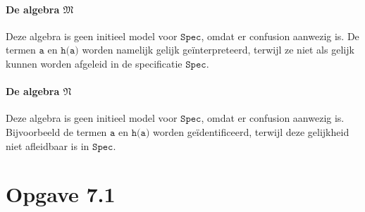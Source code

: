 \documentclass[a4paper,11pt]{article}
\begin{document}
\begin{description}
\paragraph{De algebra $\mathfrak{M}$}

Deze algebra is geen initieel model voor $\texttt{Spec}$, omdat er confusion
aanwezig is. De termen $\texttt{a}$ en $\texttt{h(a)}$ worden namelijk gelijk
ge\"interpreteerd, terwijl ze niet als gelijk kunnen worden afgeleid in de
specificatie $\texttt{Spec}$.

\paragraph{De algebra $\mathfrak{N}$}

Deze algebra is geen initieel model voor $\texttt{Spec}$, omdat er
confusion aanwezig is. Bijvoorbeeld de termen $\texttt{a}$ en $\texttt{h(a)}$
worden ge\"identificeerd, terwijl deze gelijkheid niet afleidbaar is in
$\texttt{Spec}$.

\end{description}


\section*{Opgave 7.1}
\end{document}
